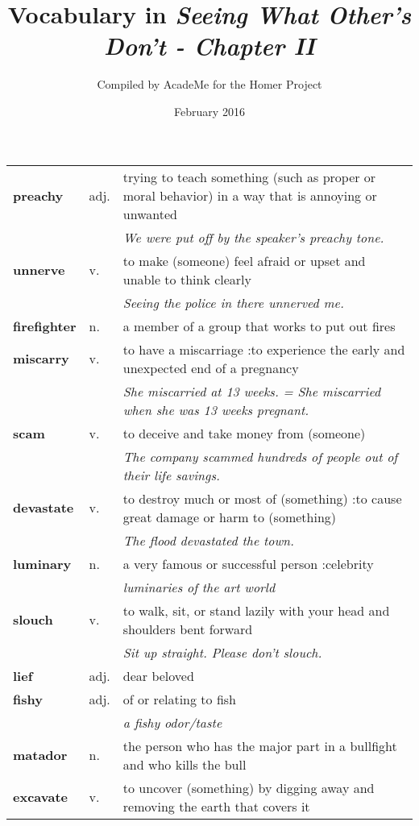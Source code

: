 \documentclass[a4paper]{article}
\title{Vocabulary in \textit{Seeing What Other's Don't - Chapter II }}
\author{Compiled by AcadeMe for the Homer Project}
\date{February 2016}
\begin{document}
\maketitle
\begin{longtable}{llp{11cm}}
\textbf{preachy} & adj. &  trying to teach something (such as proper or moral behavior) in a way that is annoying or unwanted \\
 & & \textit{We were put off by the speaker's preachy tone.}\\[0.08cm]
\textbf{unnerve} & v. &  to make (someone) feel afraid or upset and unable to think clearly \\
 & & \textit{Seeing the police in there unnerved me.}\\[0.08cm]
\textbf{firefighter} & n. &  a member of a group that works to put out fires\\[0.08cm]
\textbf{miscarry} & v. &  to have a miscarriage :to experience the early and unexpected end of a pregnancy \\
 & & \textit{She miscarried at 13 weeks. = She miscarried when she was 13 weeks pregnant.}\\[0.08cm]
\textbf{scam} & v. &  to deceive and take money from (someone) \\
 & & \textit{The company scammed hundreds of people out of their life savings.}\\[0.08cm]
\textbf{devastate} & v. &  to destroy much or most of (something) :to cause great damage or harm to (something) \\
 & & \textit{The flood devastated the town.}\\[0.08cm]
\textbf{luminary} & n. &  a very famous or successful person :celebrity \\
 & & \textit{luminaries of the art world}\\[0.08cm]
\textbf{slouch} & v. &  to walk, sit, or stand lazily with your head and shoulders bent forward \\
 & & \textit{Sit up straight. Please don't slouch.}\\[0.08cm]
\textbf{lief} & adj. &  dear beloved\\[0.08cm]
\textbf{fishy} & adj. &  of or relating to fish\\
 & & \textit{a fishy odor/taste}\\[0.08cm]
\textbf{matador} & n. &  the person who has the major part in a bullfight and who kills the bull\\[0.08cm]
\textbf{excavate} & v. &  to uncover (something) by digging away and removing the earth that covers it \\

\end{longtable}
\end{document}
